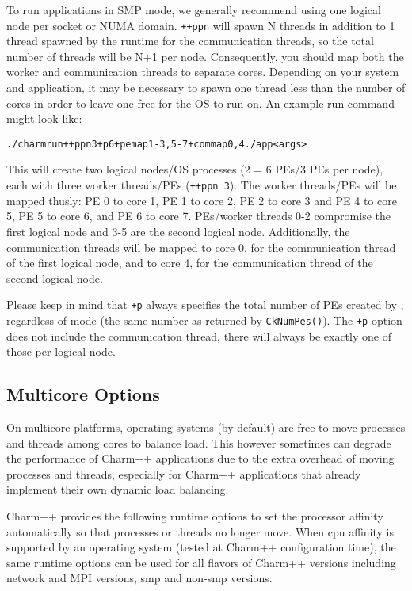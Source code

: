 To run applications in SMP mode, we generally recommend using one logical node
per socket or NUMA domain.
\texttt{++ppn} will spawn N threads in addition to 1 thread spawned
by the runtime for the communication threads, so the total number of threads
will be N+1 per node. Consequently, you should map both the worker and communication
threads to separate cores. Depending on your system and application, it may be
necessary to spawn one thread less than the number of cores in order to leave
one free for the OS to run on. An example run command might look like:

\begin{alltt}
./charmrun ++ppn 3 +p6 +pemap 1-3,5-7 +commap 0,4 ./app <args>
\end{alltt}

This will create two logical nodes/OS processes (2 = 6 PEs/3 PEs per node),
each with three worker threads/PEs (\texttt{++ppn 3}). The worker threads/PEs
will be mapped thusly: PE 0 to core 1, PE 1 to core 2, PE 2 to core 3 and
PE 4 to core 5, PE 5 to core 6, and PE 6 to core 7. PEs/worker threads 0-2
compromise the first logical node and 3-5 are the second logical node.
Additionally, the communication threads will be mapped to core 0, for the
communication thread of the first logical node, and to core 4, for the
communication thread of the second logical node.

Please keep in mind that \texttt{+p} always specifies the total number of PEs
created by \charmpp{}, regardless of mode (the same number as returned by
\texttt{CkNumPes()}). The \texttt{+p} option does not include the communication
thread, there will always be exactly one of those per logical node.

\subsection{Multicore Options}

On multicore platforms, operating systems (by default) are free to move
processes and threads among cores to balance load. This however sometimes can
degrade the performance of Charm++ applications due to the extra overhead of
moving processes and threads, especially for Charm++ applications that already
implement their own dynamic load balancing.

Charm++ provides the following runtime options to set the processor affinity
automatically so that processes or threads no longer move. When cpu affinity
is supported by an operating system (tested at Charm++ configuration time),
the same runtime options can be used for all flavors of Charm++ versions
including network and MPI versions, smp and non-smp versions.

